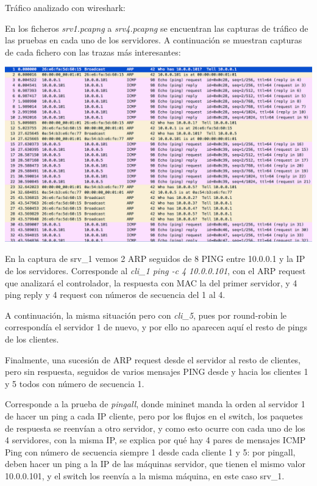 \documentclass{article}
\begin{document}

Tráfico analizado con wireshark:

\hfil

En los ficheros \textit{srv1.pcapng} a \textit{srv4.pcapng} se encuentran las capturas de tráfico de las pruebas en cada uno de los servidores. A continuación se muestran capturas de cada fichero con las trazas más interesantes:


\begin{center}
	\includegraphics[scale=0.5]{images/srv1.png}
\end{center}

\hfill

En la captura de srv\_1 vemos 2 ARP seguidos de 8 PING entre 10.0.0.1 y la IP de los servidores. Corresponde al \textit{cli\_1 ping -c 4 10.0.0.101}, con el ARP request que analizará el controlador, la respuesta con MAC la del primer servidor, y 4 ping reply y 4 request con números de secuencia del 1 al 4.

A continuación, la misma situación pero con \textit{cli\_5}, pues por round-robin le correspondía el servidor 1 de nuevo, y por ello no aparecen aquí el resto de pings de los clientes.

Finalmente, una sucesión de ARP request desde el servidor al resto de clientes, pero sin respuesta, seguidos de varios mensajes PING desde y hacia los clientes 1 y 5 todos con número de secuencia 1.

Corresponde a la prueba de \textit{pingall}, donde mininet manda la orden al servidor 1 de hacer un ping a cada IP cliente, pero por los flujos en el switch, los paquetes de respuesta se reenvían a otro servidor, y como esto ocurre con cada uno de los 4 servidores, con la misma IP, se explica por qué hay 4 pares de mensajes ICMP Ping con número de secuencia siempre 1 desde cada cliente 1 y 5: por pingall, deben hacer un ping a la IP de las máquinas servidor, que tienen el mismo valor 10.0.0.101, y el switch los reenvía a la misma máquina, en este caso srv\_1.
\end{document}
